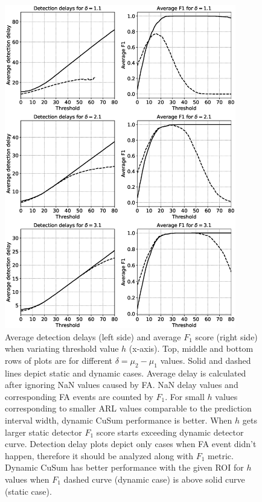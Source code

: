 \begin{figure}[!htb]
	\centering
	\includegraphics[width=0.90\textwidth]{pics/journal_paper/performance_detection_sim}
	\caption{Average detection delays (left side) and average $F_1$ score (right side) when variating threshold value $h$ (x-axis).
	Top, middle and bottom rows of plots are for different $\delta = \mu_2 - \mu_1$ values.
	Solid and dashed lines depict static and dynamic cases.
    Average delay is calculated after ignoring NaN values caused by FA.
    NaN delay values and corresponding FA events are counted by $F_1$.
    For small $h$ values corresponding to smaller ARL values comparable to the prediction interval width, dynamic CuSum performance is better.
    When $h$ gets larger static detector $F_1$ score starts exceeding dynamic detector curve.
    Detection delay plots depict only cases when FA event didn't happen, therefore it should be analyzed along with $F_1$ metric.
    Dynamic CuSum has better performance with the given ROI for $h$ values when $F_1$ dashed curve (dynamic case) is above solid curve (static case).
	}
	\label{fig:artificial_signal_perf_results}
\end{figure}


